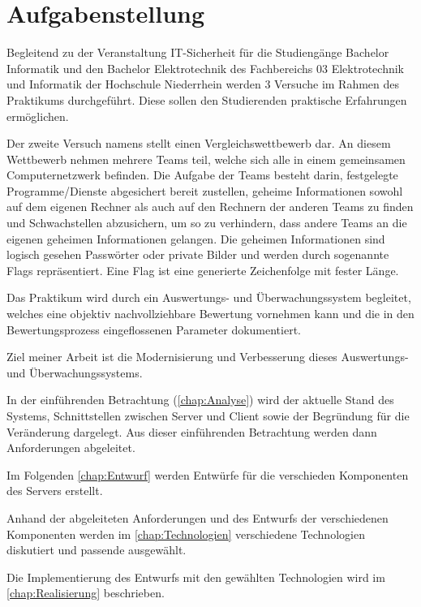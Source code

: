 \section{Aufgabenstellung}
\label{sec:Aufgabenstellung}
Begleitend zu der Veranstaltung IT-Sicherheit für die Studiengänge Bachelor Informatik und den Bachelor Elektrotechnik des Fachbereichs 03 Elektrotechnik und Informatik der Hochschule Niederrhein werden 3 Versuche im Rahmen des Praktikums durchgeführt. Diese sollen den Studierenden praktische Erfahrungen ermöglichen.

Der zweite Versuch namens  stellt einen Vergleichswettbewerb dar. An diesem Wettbewerb nehmen mehrere Teams teil, welche sich alle in einem gemeinsamen Computernetzwerk befinden. Die Aufgabe der Teams besteht darin, festgelegte Programme/Dienste abgesichert bereit zustellen, geheime Informationen sowohl auf dem eigenen Rechner als auch auf den Rechnern der anderen Teams zu finden und Schwachstellen abzusichern, um so zu verhindern, dass andere Teams an die eigenen geheimen Informationen gelangen.\cite[S. 2]{sosnaKonzeptionUndRealisierung2010} Die geheimen Informationen sind logisch gesehen Passwörter oder private Bilder und werden durch sogenannte Flags repräsentiert. Eine Flag ist eine generierte Zeichenfolge mit fester Länge.

Das Praktikum wird durch ein Auswertungs- und Überwachungssystem begleitet, welches eine objektiv nachvollziehbare Bewertung vornehmen kann und die in den Bewertungsprozess eingeflossenen Parameter dokumentiert.\cite[S. 2]{sosnaKonzeptionUndRealisierung2010}

Ziel meiner Arbeit ist die Modernisierung und Verbesserung dieses Auswertungs- und Überwachungssystems.

In der einführenden Betrachtung (\autoref{chap:Analyse}) wird der aktuelle Stand des Systems, Schnittstellen zwischen Server und Client sowie der Begründung für die Veränderung dargelegt. Aus dieser einführenden Betrachtung werden dann Anforderungen abgeleitet.

Im Folgenden \autoref{chap:Entwurf} werden Entwürfe für die verschieden Komponenten des Servers erstellt. 

Anhand der abgeleiteten Anforderungen und des Entwurfs der verschiedenen Komponenten werden im \autoref{chap:Technologien} verschiedene Technologien diskutiert und passende ausgewählt.

Die Implementierung des Entwurfs mit den gewählten Technologien wird im \autoref{chap:Realisierung} beschrieben.

